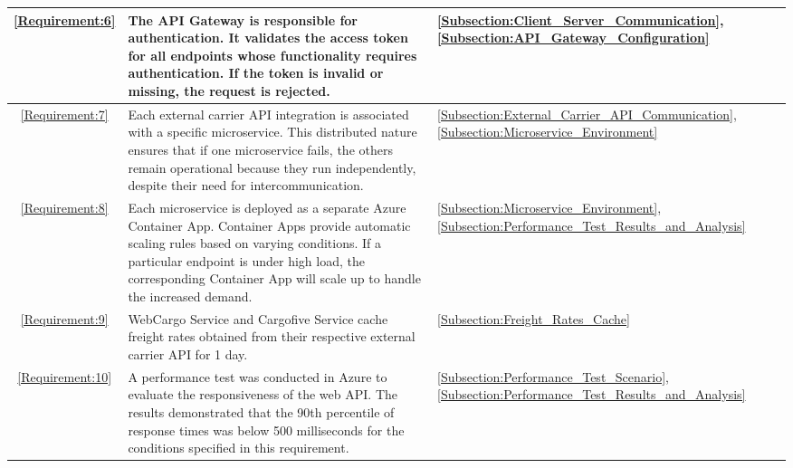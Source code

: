 \documentclass[12pt, reqno]{amsbook}
\theoremstyle{definition}
\theoremstyle{definition}
\numberwithin{section}{chapter}
\numberwithin{table}{chapter}
\numberwithin{figure}{chapter}
\begin{document}
\begin{longtable}{|c|m{280pt}|M{65pt}|}
  \hline
  \ref{Requirement:6}
   & The \ac{API} Gateway is responsible for authentication. It validates the access token for all endpoints whose functionality requires authentication. If the token is invalid or missing, the request is rejected.
   & \ref{Subsection:Client_Server_Communication}, \ref{Subsection:API_Gateway_Configuration}                                                                                                                                                                                     \\
  \hline
  \ref{Requirement:7}
   & Each external carrier \ac{API} integration is associated with a specific microservice. This distributed nature ensures that if one microservice fails, the others remain operational because they run independently, despite their need for intercommunication.
   & \ref{Subsection:External_Carrier_API_Communication}, \ref{Subsection:Microservice_Environment}                                                                                                                                                                               \\
  \hline
  \ref{Requirement:8}
   & Each microservice is deployed as a separate Azure Container App. Container Apps provide automatic scaling rules based on varying conditions. If a particular endpoint is under high load, the corresponding Container App will scale up to handle the increased demand.
   & \ref{Subsection:Microservice_Environment}, \ref{Subsection:Performance_Test_Results_and_Analysis}                                                                                                                                                                            \\
  \hline
  \ref{Requirement:9}
   & WebCargo Service and Cargofive Service cache freight rates obtained from their respective external carrier \ac{API} for 1 day.
   & \ref{Subsection:Freight_Rates_Cache}                                                                                                                                                                                                                                         \\
  \hline
  \ref{Requirement:10}
   & A performance test was conducted in Azure to evaluate the responsiveness of the web \ac{API}. The results demonstrated that the 90th percentile of response times was below 500 milliseconds for the conditions specified in this requirement.
   & \ref{Subsection:Performance_Test_Scenario}, \ref{Subsection:Performance_Test_Results_and_Analysis}                                                                                                                                                                           \\

\end{longtable}
\end{document}
